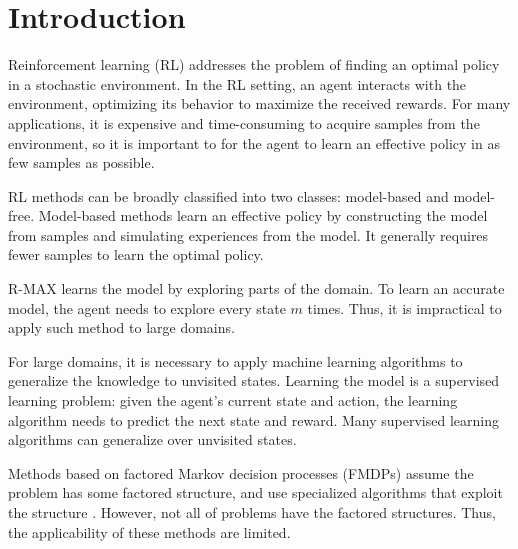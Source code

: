 

\chapter{Introduction}
\label{ch:intro}

Reinforcement learning (RL) addresses the problem of finding an optimal policy in a stochastic environment.
In the RL setting, an agent interacts with the environment, optimizing its behavior to
maximize the received rewards. For many applications, it is expensive and time-consuming to 
acquire samples from the environment, so it is important to for the agent 
to learn an effective policy in as few samples as possible. 

RL methods can be broadly classified into two classes: model-based and
model-free.
Model-based methods learn an effective policy by
constructing the model from samples and simulating experiences from the model. It
generally requires fewer samples to learn the optimal policy.

R-MAX \cite{RMaxQ} learns the model by exploring parts of the domain.
To learn an accurate model, the agent needs to explore every state $m$ times.
Thus, it is impractical to apply such method to large domains.


For large domains, it is necessary to apply machine learning algorithms to generalize
the knowledge to unvisited states. Learning the model is a supervised learning problem:
given the agent's current state and action, the learning algorithm needs to predict
the next state and reward. Many supervised learning algorithms can generalize 
over unvisited states. 


Methods based on factored Markov decision processes (FMDPs) assume the problem has some factored structure, and use 
specialized algorithms that exploit the structure \cite{ApproxFactor, SPUDD, Wynkoop08, Walsh09}. 
However, not all of problems have the factored structures. Thus, the applicability of these
methods are limited.

